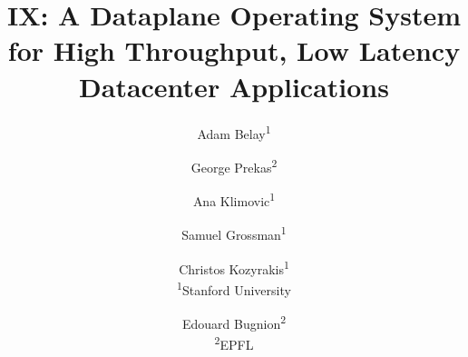 \documentclass[10pt,twocolumn]{article}
\begin{document}
\title{\bf IX: A Dataplane Operating System for High Throughput,\break
  Low Latency Datacenter Applications}


\author{Adam Belay\textsuperscript{1} \and 
  George Prekas\textsuperscript{2} \and 
  Ana Klimovic\textsuperscript{1} \and 
  Samuel Grossman\textsuperscript{1} \and
  Christos Kozyrakis\textsuperscript{1}\vspace*{5pt}\\\textsuperscript{1}Stanford
  University \and
  Edouard Bugnion\textsuperscript{2}\vspace*{5pt}\\\textsuperscript{2}EPFL}

 

\date{}
\maketitle


\pagestyle{empty}

\thispagestyle{fancy}













{\frenchspacing

}
\end{document}
